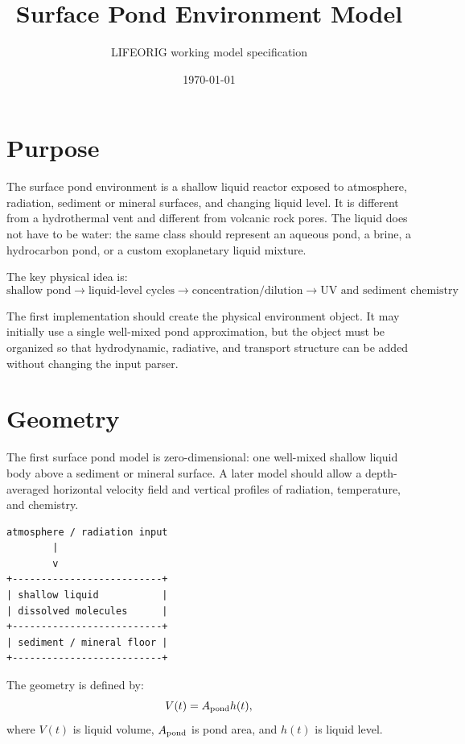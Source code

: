 \documentclass[11pt]{article}
\title{Surface Pond Environment Model}
\author{LIFEORIG working model specification}
\date{\today}
\begin{document}
\maketitle

\section{Purpose}

The surface pond environment is a shallow liquid reactor exposed to atmosphere,
radiation, sediment or mineral surfaces, and changing liquid level. It is
different from a hydrothermal vent and different from volcanic rock pores. The
liquid does not have to be water: the same class should represent an aqueous
pond, a brine, a hydrocarbon pond, or a custom exoplanetary liquid mixture.

The key physical idea is:
\begin{equation}
\boxed{
\text{shallow pond}
\rightarrow
\text{liquid-level cycles}
\rightarrow
\text{concentration/dilution}
\rightarrow
\text{UV and sediment chemistry}
}
\end{equation}

The first implementation should create the physical environment object. It may
initially use a single well-mixed pond approximation, but the object must be
organized so that hydrodynamic, radiative, and transport structure can be added
without changing the input parser.

\section{Geometry}

The first surface pond model is zero-dimensional: one well-mixed shallow liquid
body above a sediment or mineral surface. A later model should allow a
depth-averaged horizontal velocity field and vertical profiles of radiation,
temperature, and chemistry.

\begin{verbatim}
atmosphere / radiation input
        |
        v
+--------------------------+
| shallow liquid           |
| dissolved molecules      |
+--------------------------+
| sediment / mineral floor |
+--------------------------+
\end{verbatim}

The geometry is defined by:
\begin{equation}
V(t)=A_{\rm pond}h(t),
\end{equation}
where $V(t)$ is liquid volume, $A_{\rm pond}$ is pond area, and $h(t)$ is liquid
level.
\end{document}
